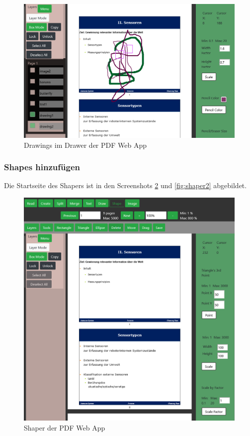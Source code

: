 \begin{figure}[!htbp]
	\centering
	\includegraphics[width=1\textwidth]{"images/drawing.png"}
	\caption{Drawings im Drawer der PDF Web App}
	\label{fig:drawing}
\end{figure}


\subsubsection{Shapes hinzufügen}
Die Startseite des Shapers ist in den Screenshots \ref{fig:shaper} und \ref{fig:shaper2} abgebildet. 

\begin{figure}[!htbp]
	\centering
	\includegraphics[width=1\textwidth]{"images/shaper.png"}
	\caption{Shaper der PDF Web App}
	\label{fig:shaper}
\end{figure}

